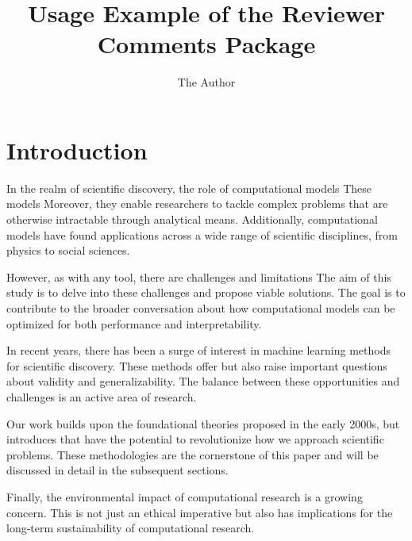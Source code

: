 \documentclass{article}
\title{Usage Example of the Reviewer Comments Package}
\author{The Author}
\begin{document}
\maketitle

\section{Introduction}

In the realm of scientific discovery, the role of computational models  
These models  
Moreover, they enable researchers to tackle complex problems that are otherwise intractable through analytical means. Additionally, computational models have found applications across a wide range of scientific disciplines, from physics to social sciences.

However, as with any tool, there are challenges and limitations  
The aim of this study is to delve into these challenges and propose viable solutions. The goal is to contribute to the broader conversation about how computational models can be optimized for both performance and interpretability.

In recent years, there has been a surge of interest in machine learning methods for scientific discovery. These methods offer  but also raise important questions about validity and generalizability. The balance between these opportunities and challenges is an active area of research.

Our work builds upon the foundational theories proposed in the early 2000s, but introduces  that have the potential to revolutionize how we approach scientific problems. These methodologies are the cornerstone of this paper and will be discussed in detail in the subsequent sections.

Finally, the environmental impact of computational research is a growing concern.  This is not just an ethical imperative but also has implications for the long-term sustainability of computational research.
\end{document}
